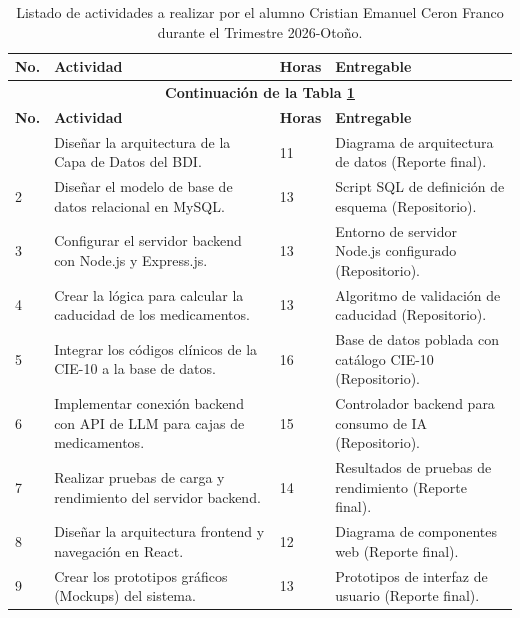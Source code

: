 {
\begin{longtable}{p{} p{} p{} p{}}
	\caption{Listado de actividades a realizar por el alumno Cristian Emanuel Ceron Franco durante el Trimestre 2026-Otoño.}
  \label{table:calendarioActividades1}\\
  \toprule
\textbf{No.} &
\textbf{Actividad} &
\textbf {Horas} &
\textbf{Entregable} \\
\hline
\endfirsthead

\multicolumn{4}{c}{\textbf{Continuación de la Tabla \ref{table:calendarioActividades1}}}\\
\hline
\textbf{No.} &
\textbf{Actividad} &
\textbf{Horas} &
\textbf{Entregable} \\
\hline
\endhead
\hline
\endlastfoot
1 &
Diseñar la arquitectura de la Capa de Datos del BDI. &
11 &
Diagrama de arquitectura de datos (Reporte final). \\
    \midrule

2 &
Diseñar el modelo de base de datos relacional en MySQL. &
13 &
Script SQL de definición de esquema (Repositorio). \\
    \midrule

3 &
Configurar el servidor backend con Node.js y Express.js. &
13 &
Entorno de servidor Node.js configurado (Repositorio). \\
    \midrule
    
4 &
Crear la lógica para calcular la caducidad de los medicamentos. &
13 &
Algoritmo de validación de caducidad (Repositorio). \\
    \midrule

5 &
Integrar los códigos clínicos de la CIE-10 a la base de datos. &
16 &
Base de datos poblada con catálogo CIE-10 (Repositorio). \\
    \midrule

6 &
Implementar conexión backend con API de LLM para cajas de medicamentos. &
15 &
Controlador backend para consumo de IA (Repositorio). \\
    \midrule

7 &
Realizar pruebas de carga y rendimiento del servidor backend. &
14 &
Resultados de pruebas de rendimiento (Reporte final). \\
    \midrule

8 &
Diseñar la arquitectura frontend y navegación en React. &
12 &
Diagrama de componentes web (Reporte final). \\
    \midrule

9 &
Crear los prototipos gráficos (Mockups) del sistema. &
13 &
Prototipos de interfaz de usuario (Reporte final). \\
    \midrule


\end{longtable}}
